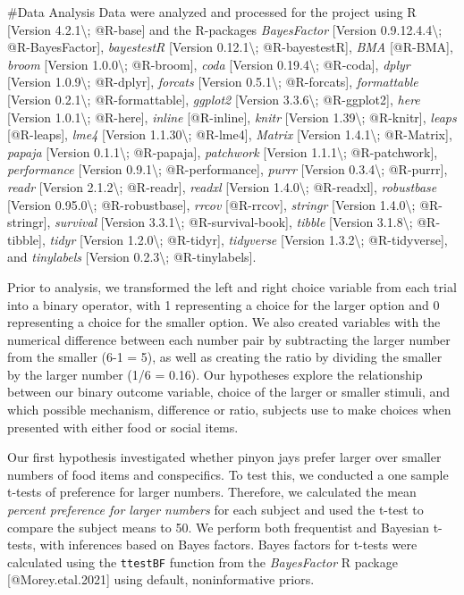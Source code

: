 \documentclass[
]{article}
\begin{document}
\#Data Analysis Data were analyzed and processed for the project using R
{[}Version 4.2.1\textbackslash; @R-base{]} and the R-packages
\emph{BayesFactor} {[}Version 0.9.12.4.4\textbackslash;
@R-BayesFactor{]}, \emph{bayestestR} {[}Version 0.12.1\textbackslash;
@R-bayestestR{]}, \emph{BMA} {[}@R-BMA{]}, \emph{broom} {[}Version
1.0.0\textbackslash; @R-broom{]}, \emph{coda} {[}Version
0.19.4\textbackslash; @R-coda{]}, \emph{dplyr} {[}Version
1.0.9\textbackslash; @R-dplyr{]}, \emph{forcats} {[}Version
0.5.1\textbackslash; @R-forcats{]}, \emph{formattable} {[}Version
0.2.1\textbackslash; @R-formattable{]}, \emph{ggplot2} {[}Version
3.3.6\textbackslash; @R-ggplot2{]}, \emph{here} {[}Version
1.0.1\textbackslash; @R-here{]}, \emph{inline} {[}@R-inline{]},
\emph{knitr} {[}Version 1.39\textbackslash; @R-knitr{]}, \emph{leaps}
{[}@R-leaps{]}, \emph{lme4} {[}Version 1.1.30\textbackslash; @R-lme4{]},
\emph{Matrix} {[}Version 1.4.1\textbackslash; @R-Matrix{]},
\emph{papaja} {[}Version 0.1.1\textbackslash; @R-papaja{]},
\emph{patchwork} {[}Version 1.1.1\textbackslash; @R-patchwork{]},
\emph{performance} {[}Version 0.9.1\textbackslash; @R-performance{]},
\emph{purrr} {[}Version 0.3.4\textbackslash; @R-purrr{]}, \emph{readr}
{[}Version 2.1.2\textbackslash; @R-readr{]}, \emph{readxl} {[}Version
1.4.0\textbackslash; @R-readxl{]}, \emph{robustbase} {[}Version
0.95.0\textbackslash; @R-robustbase{]}, \emph{rrcov} {[}@R-rrcov{]},
\emph{stringr} {[}Version 1.4.0\textbackslash; @R-stringr{]},
\emph{survival} {[}Version 3.3.1\textbackslash; @R-survival-book{]},
\emph{tibble} {[}Version 3.1.8\textbackslash; @R-tibble{]}, \emph{tidyr}
{[}Version 1.2.0\textbackslash; @R-tidyr{]}, \emph{tidyverse} {[}Version
1.3.2\textbackslash; @R-tidyverse{]}, and \emph{tinylabels} {[}Version
0.2.3\textbackslash; @R-tinylabels{]}.

Prior to analysis, we transformed the left and right choice variable
from each trial into a binary operator, with 1 representing a choice for
the larger option and 0 representing a choice for the smaller option. We
also created variables with the numerical difference between each number
pair by subtracting the larger number from the smaller (6-1 = 5), as
well as creating the ratio by dividing the smaller by the larger number
(1/6 = 0.16). Our hypotheses explore the relationship between our binary
outcome variable, choice of the larger or smaller stimuli, and which
possible mechanism, difference or ratio, subjects use to make choices
when presented with either food or social items.

Our first hypothesis investigated whether pinyon jays prefer larger over
smaller numbers of food items and conspecifics. To test this, we
conducted a one sample t-tests of preference for larger numbers.
Therefore, we calculated the mean \emph{percent preference for larger
numbers} for each subject and used the t-test to compare the subject
means to 50. We perform both frequentist and Bayesian t-tests, with
inferences based on Bayes factors. Bayes factors for t-tests were
calculated using the \texttt{ttestBF} function from the
\emph{BayesFactor} R package {[}@Morey.etal.2021{]} using default,
noninformative priors.
\end{document}
